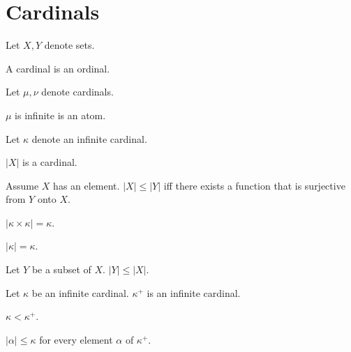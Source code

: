 \documentclass{article}
\begin{document}
  \section{Cardinals}

  \begin{forthel}
    Let $X, Y$ denote sets.

    \begin{signature}
      A cardinal is an ordinal.
    \end{signature}

    Let $\mu, \nu$ denote cardinals.

    \begin{signature}
      $\mu$ is infinite is an atom.
    \end{signature}

    Let $\kappa$ denote an infinite cardinal.

    \begin{signature}\label{Cardinality}
      $|X|$ is a cardinal.
    \end{signature}

    \begin{axiom}\label{existence_of_surjection}
      Assume $X$ has an element.
      $|X| \leq |Y|$ iff there exists a function that is surjective from $Y$ onto $X$.
    \end{axiom}

    \begin{axiom}[Hessenberg]
      $|\kappa \times \kappa| = \kappa$.
    \end{axiom}

    \begin{axiom}
      $|\kappa| = \kappa$.
    \end{axiom}

    \begin{axiom}
      Let $Y$ be a subset of $X$.
      $|Y| \leq |X|$.
    \end{axiom}

    \begin{signature}
      Let $\kappa$ be an infinite cardinal.
      $\kappa^{+}$ is an infinite cardinal.
    \end{signature}

    \begin{axiom}
      $\kappa < \kappa^{+}$.
    \end{axiom}

    \begin{axiom}
      $|\alpha| \leq \kappa$ for every element $\alpha$ of $\kappa^{+}$.
    \end{axiom}


\end{forthel}
\end{document}
